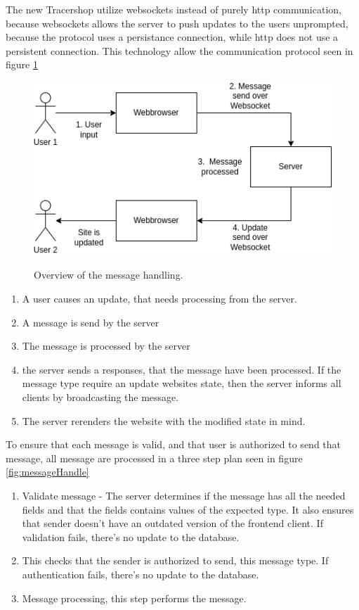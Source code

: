 \documentclass{article}
\begin{document}
The new Tracershop utilize websockets instead of purely http communication, because websockets allows the server to push updates to the users unprompted,
because the protocol uses a persistance connection, while http does not use a persistent connection.
This technology allow the communication protocol seen in figure \ref*{fig:websocketMessage}
\begin{figure}[ht]
  \begin{center}
    \includegraphics[width=0.6\linewidth]{websocketMessage.png}
    \label{fig:websocketMessage}
    \caption{Overview of the message handling.}
  \end{center}
\end{figure}

\begin{enumerate}
  \item A user causes an update, that needs processing from the server.
  \item A message is send by the server
  \item The message is processed by the server
  \item the server sends a responses, that the message have been processed. If the message type require an update websites state, then the server informs all clients by broadcasting the message.
  \item The server rerenders the website with the modified state in mind.
\end{enumerate}

To ensure that each message is valid, and that user is authorized to send that message, all message are processed in a three step plan seen in figure \ref*{fig:messageHandle}

\begin{enumerate}
  \item Validate message - The server determines if the message has all the needed fields and that the fields contains values of the expected type. It also ensures that sender doesn't have an outdated version of the frontend client. If validation fails, there's no update to the database.
  \item This checks that the sender is authorized to send, this message type. If authentication fails, there's no update to the database.
  \item Message processing, this step performs the message.
\end{enumerate}
\end{document}
